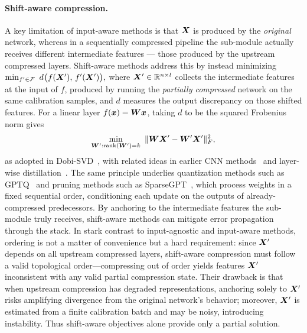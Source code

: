 \documentclass[10pt]{article} %
\theoremstyle{definition}
\theoremstyle{remark}
\begin{document}
\paragraph{Shift-aware compression.}
A key limitation of input-aware methods is that ${\bm{X}}$ is produced by the \emph{original} network, whereas in a sequentially compressed pipeline the sub-module actually receives different intermediate features — those produced by the upstream compressed layers.
Shift-aware methods address this by instead minimizing
$
\min_{f' \in {\mathcal{F}}} \ d \: \!\bigl(f({\bm{X}}'),\, f'({\bm{X}}')\bigr),
$
where ${\bm{X}}' \in \mathbb{R}^{n \times l}$ collects the intermediate features at the input of $f$, produced by running the \emph{partially compressed} network on the same calibration samples, and $d$ measures the output discrepancy on those shifted features.
For a linear layer $f({\bm{x}}) = {\bm{W}}{\bm{x}}$, taking $d$ to be the squared Frobenius norm gives
\[
\min_{{\bm{W}}' : \mathrm{rank}({\bm{W}}') = k} \ \| {\bm{W}} {\bm{X}}' - {\bm{W}}' {\bm{X}}' \|_F^2,
\]
as adopted in Dobi-SVD~\citep{Wang2025DobiSVD}, with related ideas in earlier CNN methods~\citep{denton2014exploiting, jaderberg2014speeding} and layer-wise distillation~\citep{jiao2020tinybert}.
The same principle underlies quantization methods such as GPTQ~\citep{frantar2022gptq} and pruning methods such as SparseGPT~\citep{frantar2023sparsegpt}, which process weights in a fixed sequential order, conditioning each update on the outputs of already-compressed predecessors.
By anchoring to the intermediate features the sub-module truly receives, shift-aware methods can mitigate error propagation through the stack.
In stark contrast to input-agnostic and input-aware methods, ordering is not a matter of convenience but a hard requirement: since ${\bm{X}}'$ depends on all upstream compressed layers, shift-aware compression must follow a valid topological order—compressing out of order yields features ${\bm{X}}'$ inconsistent with any valid partial compression state.
Their drawback is that when upstream compression has degraded representations, anchoring solely to ${\bm{X}}'$ risks amplifying divergence from the original network's behavior; moreover, ${\bm{X}}'$ is estimated from a finite calibration batch and may be noisy, introducing instability.
Thus shift-aware objectives alone provide only a partial solution.
\end{document}

